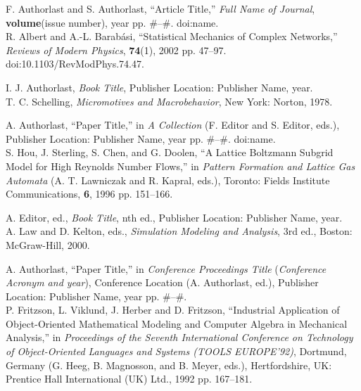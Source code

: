 \documentclass{article}
\begin{document}
\begin{thebibliography}{99}

F. Authorlast and S. Authorlast, ``Article Title,'' \textit{Full
Name of Journal}, \textbf{volume}(issue number), year pp. \#--\#.
doi:name.\\
R. Albert and A.-L. Barab{\' a}si, ``Statistical Mechanics of Complex
Networks,'' \textit{Reviews of Modern Physics}, \textbf{74}(1), 
2002 pp. 47--97.  doi:10.1103/RevModPhys.74.47.

I. J. Authorlast, \textit{Book Title}, Publisher Location: Publisher Name, year. \\
T. C. Schelling, \textit{Micromotives and Macrobehavior}, New York: Norton, 1978. 

A. Authorlast, ``Paper Title,'' in \textit{A Collection} (F. Editor and
S. Editor, eds.), Publisher Location: Publisher Name, year pp.
\#--\#. doi:name.\\
S. Hou, J. Sterling, S. Chen, and G. Doolen, ``A Lattice Boltzmann
Subgrid Model for High Reynolds Number Flows,'' in \textit{Pattern
Formation and Lattice Gas Automata} (A. T. Lawniczak and R. Kapral,
eds.), Toronto: Fields Institute Communications, \textbf{6}, 1996
pp. 151--166.

A. Editor, ed., \textit{Book Title}, nth ed., Publisher Location: Publisher Name, year. \\
A. Law and D. Kelton, eds., \textit{Simulation Modeling and
Analysis}, 3rd ed., Boston: McGraw-Hill, 2000.

A. Authorlast, ``Paper Title,'' in \textit{Conference Proceedings
Title} (\textit{Conference Acronym and year}), Conference Location
(A. Authorlast, ed.), Publisher Location: Publisher Name, year pp.
\#--\#.\\
P. Fritzson, L. Viklund, J. Herber and D. Fritzson, ``Industrial
Application of Object-Oriented Mathematical Modeling and Computer
Algebra in Mechanical Analysis,'' in \textit{Proceedings of the
Seventh  International Conference on Technology of Object-Oriented
Languages and Systems (TOOLS EUROPE'92)}, Dortmund, Germany 
(G.  Heeg, B. Magnosson, and B. Meyer, eds.), Hertfordshire, UK: Prentice
Hall International (UK) Ltd., 1992 pp. 167--181.


\end{thebibliography}
\end{document}

